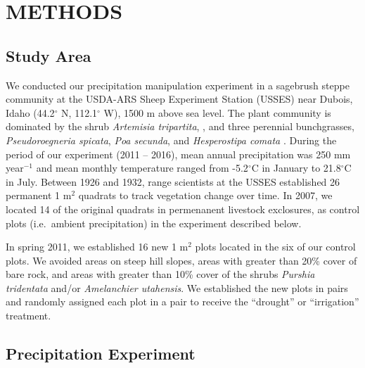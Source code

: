 \documentclass[fleqn,10pt,lineno]{wlpeerj} %
\begin{document}
\section{METHODS}\label{methods}

\subsection{Study Area}\label{study-area}

We conducted our precipitation manipulation experiment in a sagebrush
steppe community at the USDA-ARS Sheep Experiment Station (USSES) near
Dubois, Idaho (44.2\(^{\circ}\) N, 112.1\(^{\circ}\) W), 1500 m above
sea level. The plant community is dominated by the shrub
\emph{Artemisia tripartita},
, and three
perennial bunchgrasses, \emph{Pseudoroegneria spicata},
\emph{Poa secunda}, and \emph{Hesperostipa comata}
. During the period of
our experiment (2011 -- 2016), mean annual precipitation was 250 mm
year\(\phantom{}^{-1}\) and mean monthly temperature ranged from
-5.2\(^{\circ}\)C in January to 21.8\(^{\circ}\)C in July. Between 1926
and 1932, range scientists at the USSES established 26 permanent 1
m\(^2\) quadrats to track vegetation change over time. In 2007, we
located 14 of the original quadrats in permenanent livestock exclosures,
 as control plots (i.e.~ambient precipitation) in the
experiment described below.

In spring 2011, we established 16 new 1 m\(^2\) plots located in the
 six of our
control plots. We avoided areas on steep hill slopes, areas with greater
than 20\% cover of bare rock, and areas with greater than 10\% cover of
the shrubs \emph{Purshia tridentata} and/or
\emph{Amelanchier utahensis}. We established the new plots in pairs and
randomly assigned each plot in a pair to receive the ``drought'' or
``irrigation'' treatment.

\subsection{Precipitation Experiment}\label{precipitation-experiment}
\end{document}
